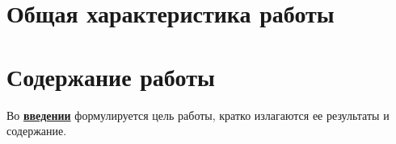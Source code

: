 \section*{Общая характеристика работы}

\newcommand{\actuality}{\pdfbookmark[1]{Актуальность}{actuality}\underline{\textbf{\actualityTXT}}}
\newcommand{\progress}{\pdfbookmark[1]{Разработанность темы}{progress}\underline{\textbf{\progressTXT}}}
\newcommand{\aim}{\pdfbookmark[1]{Цели}{aim}\underline{{\textbf\aimTXT}}}
\newcommand{\tasks}{\pdfbookmark[1]{Задачи}{tasks}\underline{\textbf{\tasksTXT}}}
\newcommand{\aimtasks}{\pdfbookmark[1]{Цели и задачи}{aimtasks}\aimtasksTXT}
\newcommand{\novelty}{\pdfbookmark[1]{Научная новизна}{novelty}\underline{\textbf{\noveltyTXT}}}
\newcommand{\influence}{\pdfbookmark[1]{Практическая значимость}{influence}\underline{\textbf{\influenceTXT}}}
\newcommand{\methods}{\pdfbookmark[1]{Методология и методы исследования}{methods}\underline{\textbf{\methodsTXT}}}
\newcommand{\defpositions}{\pdfbookmark[1]{Положения, выносимые на защиту}{defpositions}\underline{\textbf{\defpositionsTXT}}}
\newcommand{\reliability}{\pdfbookmark[1]{Достоверность}{reliability}\underline{\textbf{\reliabilityTXT}}}
\newcommand{\probation}{\pdfbookmark[1]{Апробация}{probation}\underline{\textbf{\probationTXT}}}
\newcommand{\contribution}{\pdfbookmark[1]{Личный вклад}{contribution}\underline{\textbf{\contributionTXT}}}
\newcommand{\publications}{\pdfbookmark[1]{Публикации}{publications}\underline{\textbf{\publicationsTXT}}}




\section*{Содержание работы}
Во \underline{\textbf{введении}} формулируется цель работы, кратко излагаются ее результаты и содержание. 

